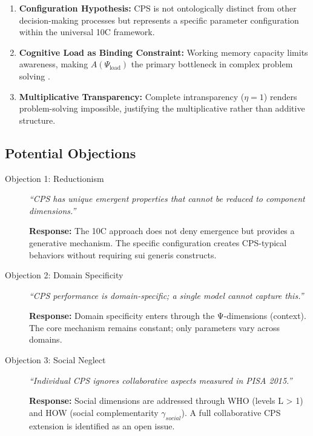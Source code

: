 \begin{enumerate}
\item \textbf{Configuration Hypothesis:} CPS is not ontologically distinct from other decision-making processes but represents a specific parameter configuration within the universal 10C framework.

\item \textbf{Cognitive Load as Binding Constraint:} Working memory capacity limits awareness, making $A(\Psi_{\text{load}})$ the primary bottleneck in complex problem solving \citep{sweller1988cognitiveload}.

\item \textbf{Multiplicative Transparency:} Complete intransparency ($\eta = 1$) renders problem-solving impossible, justifying the multiplicative rather than additive structure.
\end{enumerate}

\subsection{Potential Objections}

\begin{description}
\item[Objection 1: Reductionism] \textit{``CPS has unique emergent properties that cannot be reduced to component dimensions.''}

\textbf{Response:} The 10C approach does not deny emergence but provides a generative mechanism. The specific configuration creates CPS-typical behaviors without requiring sui generis constructs.

\item[Objection 2: Domain Specificity] \textit{``CPS performance is domain-specific; a single model cannot capture this.''}

\textbf{Response:} Domain specificity enters through the Ψ-dimensions (context). The core mechanism remains constant; only parameters vary across domains.

\item[Objection 3: Social Neglect] \textit{``Individual CPS ignores collaborative aspects measured in PISA 2015.''}

\textbf{Response:} Social dimensions are addressed through WHO (levels L > 1) and HOW (social complementarity $\gamma_{social}$). A full collaborative CPS extension is identified as an open issue.
\end{description}




